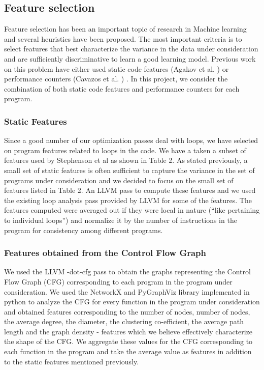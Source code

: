\documentclass[10pt]{sigplanconf}
\begin{document}
\subsection{Feature selection}
Feature selection has been an important topic of research in Machine learning and several heuristics have been proposed. The most important criteria is to select features that best characterize the variance in the data under consideration and are sufficiently discriminative to learn a good learning model. Previous work on this problem have either used static code features (Agakov et al. \cite{c5} ) or performance counters (Cavazos et al.  \cite{c7}) . In this project, we consider the combination of  both static code features and performance counters for each program.


\subsubsection{Static Features}
Since a good number of our optimization passes deal with loops,  we have selected on program features related to loops in the code. We have a taken a subset of features used by Stephenson et al \cite{c1} as shown in Table 2. As stated previously, a small set of static features is often sufficient to capture the variance in the set of programs under consideration and we decided to focus on the small set of features listed in Table 2.  An LLVM pass to compute these features and we used the existing loop analysis pass provided by LLVM for some of the features. The features computed were averaged out if they were local in nature (“like pertaining to individual loops”) and normalize it by the number of instructions in the program for consistency among different programs. 


\subsubsection{Features obtained from the Control Flow Graph}

We used the LLVM -dot-cfg pass to obtain the graphs representing the Control Flow Graph (CFG) corresponding to each program in the program under consideration. We used the NetworkX and PyGraphViz library implemented in python to analyze the CFG for every function in the program under consideration and obtained features corresponding to the number of nodes, number of nodes, the average degree, the diameter, the clustering co-efficient, the average path length and the graph density - features which we believe effectively characterize the shape of the CFG. We aggregate these values for the CFG corresponding to each function in the program and take the average value as features in addition to the static features mentioned previously.    
\end{document}
